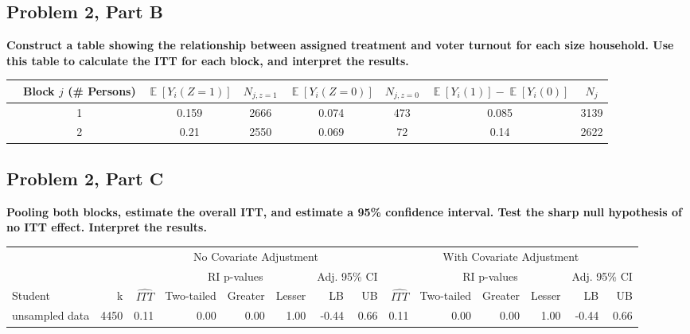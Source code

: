 \documentclass[11pt,notitlepage]{article}
\def\E{\mathop{\mathbb{E}}}
\begin{document}

\subsection{Problem 2, Part B} {\bf Construct a table showing the relationship between assigned treatment and voter turnout for each size household.  Use this table to calculate the ITT for each block, and interpret the results.}

\vspace{1cm}

\begin{table}[ht]
\begin{center}
\begin{tabular}{rc|cc|cc|cc}
  \hline
 & Block $j$ (\# Persons) & $\E[Y_i(Z=1)]$ & $N_{j, z=1}$ & $\E[Y_i(Z=0)]$ & $N_{j, z=0}$ & $\E[Y_i(1)]-\E[Y_i(0)]$ & $N_j$ \\ 
  \hline
 & 1 & 0.159 & 2666 & 0.074 & 473 & 0.085 & 3139 \\ 
 & 2 & 0.21 & 2550 & 0.069 & 72 & 0.14 & 2622 \\ 
   \hline
\end{tabular}
\end{center}
\end{table}
 


\subsection{Problem 2, Part C} {\bf Pooling both blocks, estimate the overall ITT, and estimate a 95\% confidence interval.  Test the sharp null hypothesis of no ITT effect.  Interpret the results.}

\vspace{1cm}


\begin{table}[h!]\footnotesize\onehalfspacing
\begin{center}
\begin{tabular}{lrrrrrrr|rrrrrr}
  \hline
  & & \multicolumn{6}{c|}{No Covariate Adjustment} & \multicolumn{6}{c}{With Covariate Adjustment} \\
  \cline{3-14}
  & & & \multicolumn{3}{c}{RI p-values} & \multicolumn{2}{c|}{Adj. 95\% CI} &  & \multicolumn{3}{c}{RI p-values} & \multicolumn{2}{c}{Adj. 95\% CI} \\
  \cline{4-6}\cline{10-12}
Student & k & $\widehat{ITT}$ & Two-tailed & Greater & Lesser & LB & UB & $\widehat{ITT}$ & Two-tailed & Greater & Lesser & LB & UB \\ 
  \hline
unsampled data & 4450 & 0.11 & 0.00 & 0.00 & 1.00 & -0.44 & 0.66 & 0.11 & 0.00 & 0.00 & 1.00 & -0.44 & 0.66 \\ 
   \hline
\end{tabular}
\end{center}
\end{table}
\end{document}
